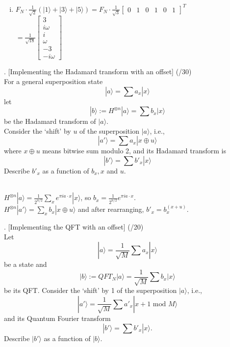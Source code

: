 \documentclass[11pt]{article}
\newenvironment{solution}{\begin{mdframed}[skipabove=\baselineskip,innertopmargin=\baselineskip,innerbottommargin=\baselineskip]
  }{\end{mdframed}}
\begin{document}
\begin{solution}
\begin{enumerate}[(i)]
    \item $F_N \cdot \frac{1}{\sqrt{2}}(|1\rangle +|3\rangle+|5\rangle) = F_N \cdot 
    \frac{1}{\sqrt{3}}\begin{bmatrix} 0 & 1 & 0 & 1 & 0 & 1 \end{bmatrix}^T$\\
    $= \frac{1}{\sqrt{18}}
    \begin{bmatrix} 3 \\ i\omega \\ i \\ \omega \\ -3 \\ -i\omega \end{bmatrix}$
\end{enumerate}
\end{solution}

\newpage

. [Implementing the Hadamard transform with an offset] (/30)
\\
For a general superposition state
$$|a\rangle = \sum a_x|x\rangle$$
let
$$|b\rangle := H^{\otimes n}|a\rangle = \sum b_x|x\rangle$$
be the Hadamard transform of $|a\rangle$. \\
Consider the ‘shift’ by $u$ of the superposition $|a\rangle$, i.e.,
$$|a'\rangle = \sum a_x|x\oplus u\rangle$$
where $x\oplus u$ means bitwise sum modulo 2, and its Hadamard transform is
$$|b'\rangle = \sum b'_x|x\rangle$$
Describe $b'_x$ as a function of $b_x,x$ and $u$. \\ \vspace{2em} \\

\begin{solution}
$H^{\otimes n}|a\rangle = \frac{1}{2^{n/2}}\sum_x e^{\pi i a\cdot x}|x\rangle$, so $b_x = \frac{1}{2^{n/2}}e^{\pi i a\cdot x}$. \vspace{2em} \\
$H^{\otimes n}|a'\rangle = \sum_x b_x|x \oplus u\rangle$ and after rearranging, $b'_x = b_x^{(x+u)}$. \\

\end{solution}

\newpage

. [Implementing the QFT with an offset] (/20)
\\
Let
$$|a\rangle = \frac{1}{\sqrt{M}}\sum a_x|x\rangle$$
be a state and
$$|b\rangle := QFT_N|a\rangle = \frac{1}{\sqrt{M}}\sum b_x|x\rangle$$
be its QFT. Consider the ‘shift’ by 1 of the superposition $|a\rangle$, i.e.,
$$|a'\rangle = \frac{1}{\sqrt{M}}\sum a'_x|x+1\text{ mod }M\rangle$$
and its Quantum Fourier transform
$$|b'\rangle = \sum b'_x|x\rangle.$$
Describe $|b'\rangle$ as a function of $|b\rangle$. %
\end{document}

